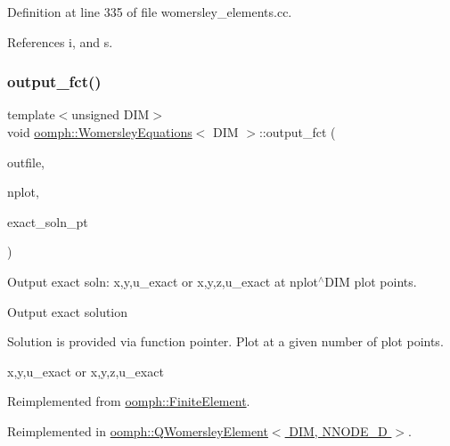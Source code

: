 Definition at line 335 of file womersley\+\_\+elements.\+cc.



References i, and s.

\mbox{\label{classoomph_1_1WomersleyEquations_aebc178cae7a5f50da1f76eed2ea3972d}} 
\subsubsection{\texorpdfstring{output\+\_\+fct()}{output\_fct()}\hspace{0.1cm}{\footnotesize\ttfamily [1/2]}}
{\footnotesize\ttfamily template$<$unsigned D\+IM$>$ \\
void \hyperlink{classoomph_1_1WomersleyEquations}{oomph\+::\+Womersley\+Equations}$<$ D\+IM $>$\+::output\+\_\+fct (\begin{DoxyParamCaption}\item[{std\+::ostream \&}]{outfile,  }\item[{const unsigned \&}]{nplot,  }\item[{\hyperlink{classoomph_1_1FiniteElement_a690fd33af26cc3e84f39bba6d5a85202}{Finite\+Element\+::\+Steady\+Exact\+Solution\+Fct\+Pt}}]{exact\+\_\+soln\+\_\+pt }\end{DoxyParamCaption})\hspace{0.3cm}{\ttfamily [virtual]}}



Output exact soln\+: x,y,u\+\_\+exact or x,y,z,u\+\_\+exact at nplot$^\wedge$\+D\+IM plot points. 

Output exact solution

Solution is provided via function pointer. Plot at a given number of plot points.

x,y,u\+\_\+exact or x,y,z,u\+\_\+exact 

Reimplemented from \hyperlink{classoomph_1_1FiniteElement_a22b695c714f60ee6cd145be348042035}{oomph\+::\+Finite\+Element}.



Reimplemented in \hyperlink{classoomph_1_1QWomersleyElement_ae15d32d03c1e64811cc29098c85d1e23}{oomph\+::\+Q\+Womersley\+Element$<$ D\+I\+M, N\+N\+O\+D\+E\+\_\+D $>$}.



